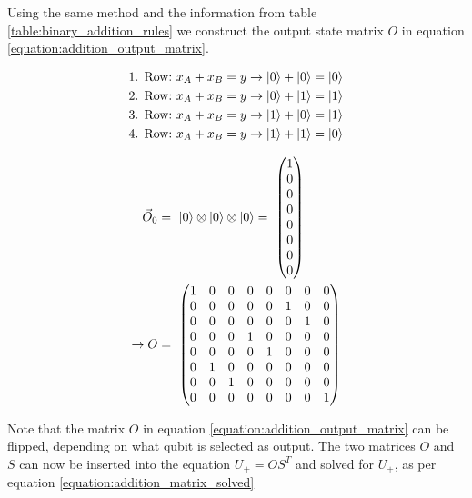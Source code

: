 Using the same method and the information from table \ref{table:binary_addition_rules} we construct the output state matrix $O$ in equation \ref{equation:addition_output_matrix}.

\begin{equation}
    \begin{split}
        \text{1. Row:}\ x_{A} + x_{B} = y \rightarrow \ket{0} + \ket{0} = \ket{0}\\    
        \text{2. Row:}\ x_{A} + x_{B} = y \rightarrow \ket{0} + \ket{1} = \ket{1}\\    
        \text{3. Row:}\ x_{A} + x_{B} = y \rightarrow \ket{1} + \ket{0} = \ket{1}\\    
        \text{4. Row:}\ x_{A} + x_{B} = y \rightarrow \ket{1} + \ket{1} = \ket{0}\\    
    \end{split}
\end{equation}

\begin{equation}
\centering
    \begin{split}
        \vec{O}_0 &=\ \ket{0} \otimes \ket{0} \otimes \ket{0} =\ \begin{pmatrix}1 \\0 \\0 \\0 \\0 \\0 \\0 \\0 \end{pmatrix} \\
        \rightarrow O &=\ \begin{pmatrix}
        1 & 0 & 0 & 0 & 0 & 0 & 0 & 0\\
        0 & 0 & 0 & 0 & 0 & 1 & 0 & 0\\
        0 & 0 & 0 & 0 & 0 & 0 & 1 & 0\\
        0 & 0 & 0 & 1 & 0 & 0 & 0 & 0\\
        0 & 0 & 0 & 0 & 1 & 0 & 0 & 0\\
        0 & 1 & 0 & 0 & 0 & 0 & 0 & 0\\
        0 & 0 & 1 & 0 & 0 & 0 & 0 & 0\\
        0 & 0 & 0 & 0 & 0 & 0 & 0 & 1
        \end{pmatrix}
    \end{split}
    \label{equation:addition_output_matrix}
\end{equation}

Note that the matrix $O$ in equation \ref{equation:addition_output_matrix} can be flipped, depending on what qubit is selected as output. The two matrices $O$ and $S$ can now be inserted into the equation $U_{+} = OS^T$ and solved for $U_{+}$, as per equation \ref{equation:addition_matrix_solved}

